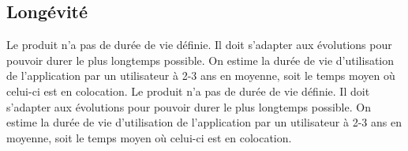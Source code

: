 \subsection{Longévité}
Le produit n'a pas de durée de vie définie. Il doit s'adapter aux évolutions pour pouvoir durer le plus longtemps possible. On estime la durée de vie d'utilisation de l'application par un utilisateur à 2-3 ans en moyenne, soit le temps moyen où celui-ci est en colocation.
Le produit n'a pas de durée de vie définie. Il doit s'adapter aux évolutions pour pouvoir durer le plus longtemps possible. On estime la durée de vie d'utilisation de l'application par un utilisateur à 2-3 ans en moyenne, soit le temps moyen où celui-ci est en colocation.